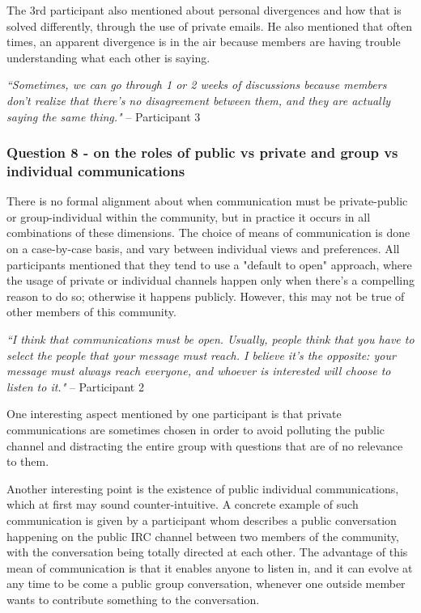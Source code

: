 \documentclass{sigchi}
\begin{document}
The 3rd participant also mentioned about personal divergences and how that is solved differently, through the use of private emails. He also mentioned that often times, an apparent divergence is in the air because members are having trouble understanding what each other is saying.

\begin{displayquote}
\textit{``Sometimes, we can go through 1 or 2 weeks of discussions because members don't realize that there's no disagreement between them, and they are actually saying the same thing."} – Participant 3
\end{displayquote}

\subsubsection{Question 8 - on the roles of public vs private and group vs individual communications}

There is no formal alignment about when communication must be private-public or group-individual within the community, but in practice it occurs in all combinations of these dimensions. The choice of means of communication is done on a case-by-case basis, and vary between individual views and preferences. All participants mentioned that they tend to use a "default to open" approach, where the usage of private or individual channels happen only when there's a compelling reason to do so; otherwise it happens publicly. However, this may not be true of other members of this community.

\begin{displayquote}
\textit{``I think that communications must be open. Usually, people think that you have to select the people that your message must reach. I believe it's the opposite: your message must always reach everyone, and whoever is interested will choose to listen to it."} – Participant 2
\end{displayquote}

One interesting aspect mentioned by one participant is that private communications are sometimes chosen in order to avoid polluting the public channel and distracting the entire group with questions that are of no relevance to them.

Another interesting point is the existence of public individual communications, which at first may sound counter-intuitive. A concrete example of such communication is given by a participant whom describes a public conversation happening on the public IRC channel between two members of the community, with the conversation being totally directed at each other. The advantage of this mean of communication is that it enables anyone to listen in, and it can evolve at any time to be come a public group conversation, whenever one outside member wants to contribute something to the conversation.
\end{document}
